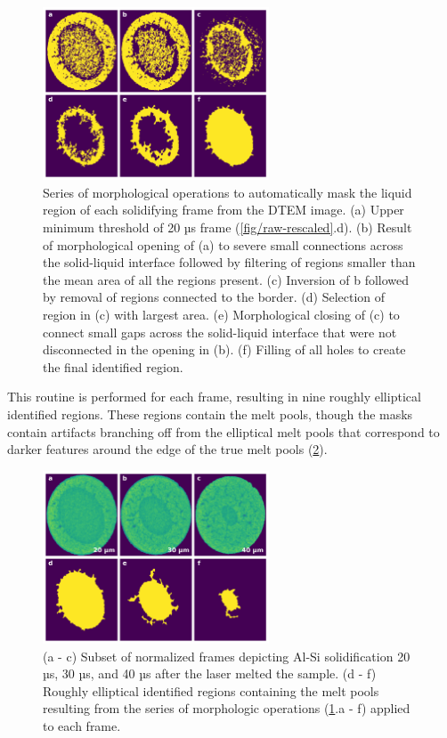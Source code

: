 \begin{figure}[ht]
    \centering
    \includegraphics[width=0.6\textwidth]{figures/04/07-morpho.png}
    \caption{
        \small{}
        Series of morphological operations to automatically mask the
        liquid region of each solidifying frame from the DTEM image.
        (a) Upper minimum threshold of 20 µs frame
        (\ref{fig/raw-rescaled}.d).
        (b) Result of morphological opening of (a) to severe small
        connections across the solid-liquid interface followed by filtering
        of regions smaller than the mean area of all the regions present.
        (c) Inversion of b followed by removal of regions connected to the
        border.
        (d) Selection of region in (c) with largest area.
        (e) Morphological closing of (c) to connect small gaps across the
        solid-liquid interface that were not disconnected in the opening in (b).
        (f) Filling of all holes to create the final identified region.
    }
    \label{fig/morpho}
\end{figure}

This routine is performed for each frame, resulting in nine roughly
elliptical identified regions. These regions contain the melt pools,
though the masks contain artifacts branching off from the elliptical melt
pools that correspond to darker features around the edge of the true melt
pools (\ref{fig/rescaled-filled}).

\begin{figure}[ht]
    \centering
    \includegraphics[width=0.6\textwidth]{figures/04/08-rescaled-filled.png}
    \caption{
        \small{}
        (a - c) Subset of normalized frames depicting Al-Si solidification
        20 µs, 30 µs, and 40 µs after the laser melted the sample.
        (d - f) Roughly elliptical identified regions containing the melt
        pools resulting from the series of morphologic operations
        (\ref{fig/morpho}.a - f)
        applied to each frame.
    }
    \label{fig/rescaled-filled}
\end{figure}

